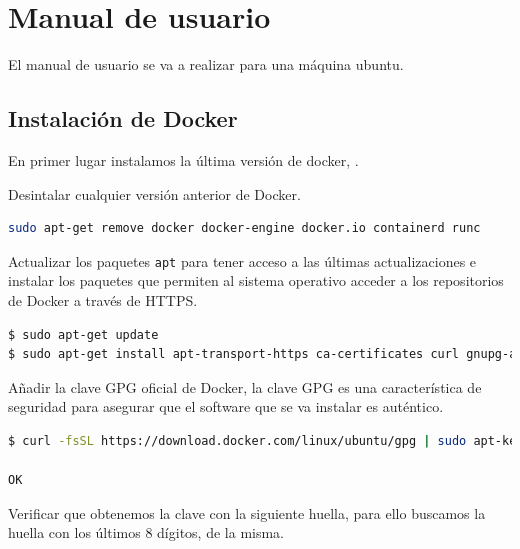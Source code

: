 \chapter{Manual de usuario}

El manual de usuario se va a realizar para una máquina ubuntu.\\

\section{Instalación de Docker}

En primer lugar instalamos la última versión de docker, \cite{instalacion-docker}. 

Desintalar cualquier versión anterior de Docker.\\

\begin{lstlisting}[language=Bash,caption=Instalación Docker. Parte I, label=cod:suma-cuerpo, style=Consola]
sudo apt-get remove docker docker-engine docker.io containerd runc
\end{lstlisting}


Actualizar los paquetes \texttt{apt} para tener acceso a las últimas actualizaciones e instalar los paquetes que permiten al sistema operativo acceder a los repositorios de Docker a través de HTTPS.\\

\begin{lstlisting}[language=Bash,caption=Instalación Docker. Parte II, label=cod:suma-cuerpo, style=Consola]
$ sudo apt-get update
$ sudo apt-get install apt-transport-https ca-certificates curl gnupg-agent software-properties-common
\end{lstlisting}

Añadir la clave GPG oficial de Docker, la clave GPG es una característica de seguridad para asegurar que el software que se va instalar es auténtico.\\
 
\begin{lstlisting}[language=Bash,caption=Instalación Docker. Parte III, label=cod:suma-cuerpo, style=Consola]
$ curl -fsSL https://download.docker.com/linux/ubuntu/gpg | sudo apt-key add -

OK
\end{lstlisting}

Verificar que obtenemos la clave con la siguiente huella, para ello buscamos la huella con los últimos 8 dígitos, de la misma.\\

